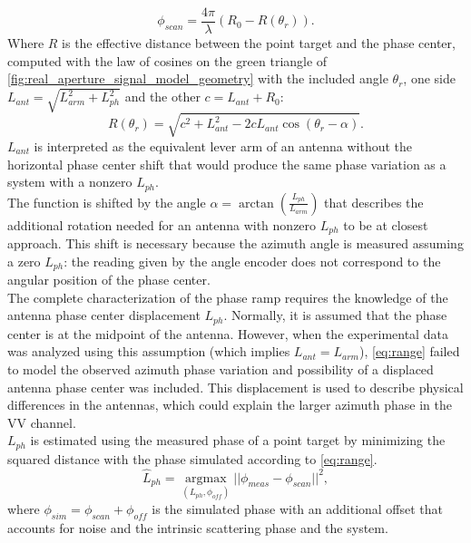\begin{equation}\label{eq:range_phase}
	\phi_{scan} = \frac{4 \pi}{\lambda}\left(R_0- R\left(\theta_r\right) \right).
\end{equation}
Where $R$ is the effective distance between the point target and the phase center, 
computed with the law of cosines on the green triangle of \autoref{fig:real_aperture_signal_model_geometry} with the included angle $\theta_r$, one  side $L_{ant} = \sqrt{L_{arm}^2 + L_{ph}^2}$ and the other $c = L_{ant} + R_0$:
\begin{equation}\label{eq:range}
	R\left(\theta_r\right) = \sqrt{ c^2 +  L_{ant}^2 - 2 c L_{ant} \cos{\left(\theta_r - \alpha\right)}}.
\end{equation}
$L_{ant}$ is interpreted as the equivalent lever arm of an antenna without the horizontal phase center shift that would produce the same phase variation as a system with a nonzero $L_{ph}$.\\
The function is shifted by the angle  $\alpha = \operatorname{\arctan}\left({\frac{L_{ph}}{L_{arm}}}\right)$ that describes the additional rotation needed for an antenna with nonzero $L_{ph}$ to be at closest approach. This shift is necessary because the azimuth angle is measured assuming a zero $L_{ph}$: the reading given by the angle encoder does not correspond to the angular position of the phase center.\\
The complete characterization of the phase ramp requires the knowledge of the antenna phase center displacement $L_{ph}$. Normally, it is assumed that the phase center is at the midpoint of the antenna. However, when the experimental data was analyzed using this assumption (which implies $L_{ant} = L_{arm}$),  \eqref{eq:range} failed to model the observed azimuth phase variation and possibility of a displaced antenna phase center was included. This displacement is used to describe physical differences in the antennas, which could explain the larger azimuth phase in the VV channel.\\ $L_{ph}$ is estimated using the measured phase of a point target by minimizing the squared distance with the phase simulated according to \eqref{eq:range}.
\begin{equation}\label{eq:rph_estimation}
	\hat{L}_{ph} = \underset{\left(L_{ph}, \phi_{off}\right)}{\operatorname{argmax}}{\vert\vert\phi_{meas} - \phi_{scan}\vert\vert}^2,
\end{equation}
where $\phi_{sim} = \phi_{scan} + \phi_{off}$ is the simulated phase with an additional offset that accounts for noise and the intrinsic scattering phase and the system.\\

